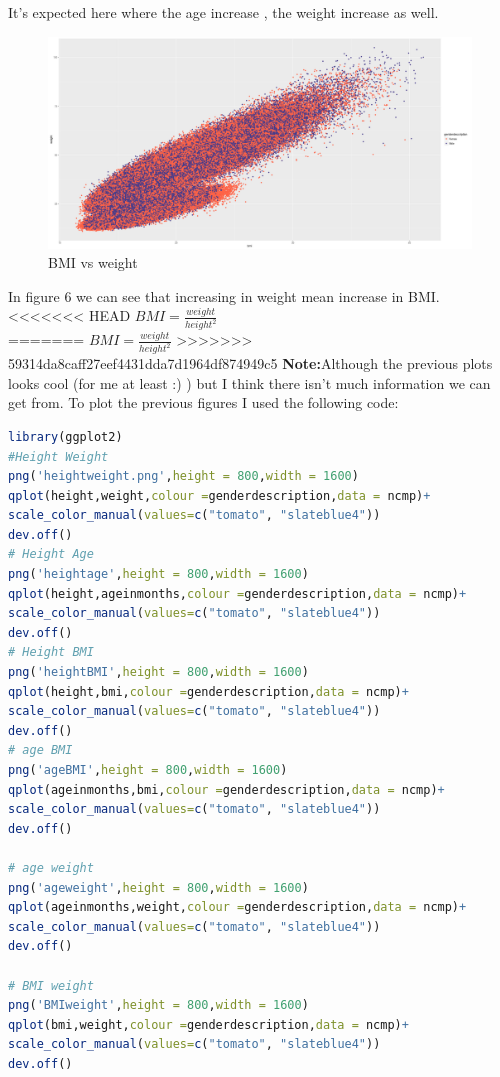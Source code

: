 \documentclass{article}
\begin{document}
It's expected here where the age increase , the weight increase as well.
\begin{figure}[H]
	\begin{center}
		\includegraphics[scale=0.3]{BMIweight.png}
	\end{center}
	\caption{BMI vs weight}
\end{figure}
In figure 6 we can see that increasing in weight mean increase in BMI.
<<<<<<< HEAD
\(BMI = \frac{weight}{height^2}\) \\
=======
\(BMI = \frac{weight}{height^2}\)
>>>>>>> 59314da8caff27eef4431dda7d1964df874949c5
\textbf{Note:}Although the previous plots looks cool (for me at least :) ) but I think there isn't much information we can get from.
To plot the previous figures I used the following code:
\begin{lstlisting}[language=R]
library(ggplot2)
#Height Weight
png('heightweight.png',height = 800,width = 1600)
qplot(height,weight,colour =genderdescription,data = ncmp)+ 
scale_color_manual(values=c("tomato", "slateblue4"))
dev.off()
# Height Age
png('heightage',height = 800,width = 1600)
qplot(height,ageinmonths,colour =genderdescription,data = ncmp)+ 
scale_color_manual(values=c("tomato", "slateblue4"))
dev.off()
# Height BMI
png('heightBMI',height = 800,width = 1600)
qplot(height,bmi,colour =genderdescription,data = ncmp)+ 
scale_color_manual(values=c("tomato", "slateblue4"))
dev.off()
# age BMI
png('ageBMI',height = 800,width = 1600)
qplot(ageinmonths,bmi,colour =genderdescription,data = ncmp)+ 
scale_color_manual(values=c("tomato", "slateblue4"))
dev.off()

# age weight
png('ageweight',height = 800,width = 1600)
qplot(ageinmonths,weight,colour =genderdescription,data = ncmp)+ 
scale_color_manual(values=c("tomato", "slateblue4"))
dev.off()

# BMI weight
png('BMIweight',height = 800,width = 1600)
qplot(bmi,weight,colour =genderdescription,data = ncmp)+ 
scale_color_manual(values=c("tomato", "slateblue4"))
dev.off()

\end{lstlisting}
\end{document}
